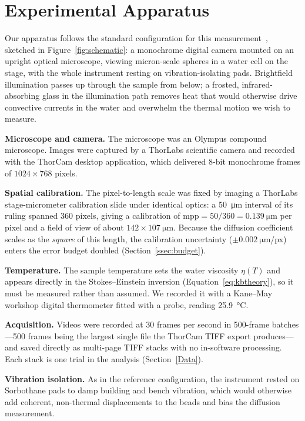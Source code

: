 \documentclass[11pt]{article}
\begin{document}
\section{Experimental Apparatus}
\label{Experimental Apparatus}
Our apparatus follows the standard configuration for this measurement~\cite{nakroshis},
sketched in Figure~\ref{fig:schematic}: a monochrome digital camera mounted on an
upright optical microscope, viewing micron-scale spheres in a water cell on the
stage, with the whole instrument resting on vibration-isolating pads. Brightfield
illumination passes up through the sample from below; a frosted, infrared-absorbing
glass in the illumination path removes heat that would otherwise drive convective
currents in the water and overwhelm the thermal motion we wish to measure.

\textbf{Microscope and camera.} The microscope was an Olympus compound microscope.
Images were captured by a ThorLabs scientific camera and recorded with the ThorCam
desktop application, which delivered 8-bit monochrome frames of $1024\times768$
pixels.

\textbf{Spatial calibration.} The pixel-to-length scale was fixed by imaging a
ThorLabs stage-micrometer calibration slide under identical optics: a
\SI{50}{\micro\meter} interval of its ruling spanned $360$ pixels, giving a
calibration of $\text{mpp} = 50/360 = \SI{0.139}{\micro\meter}$ per pixel and a field
of view of about $142\times107~\si{\micro\meter}$. Because the diffusion coefficient
scales as the \emph{square} of this length, the calibration uncertainty
($\pm\SI{0.002}{\micro\meter}$/px) enters the error budget doubled
(Section~\ref{ssec:budget}).

\textbf{Temperature.} The sample temperature sets the water viscosity $\eta(T)$ and
appears directly in the Stokes--Einstein inversion
(Equation~\eqref{eq:kbtheory}), so it must be measured rather than assumed. We
recorded it with a Kane--May workshop digital thermometer fitted with a probe,
reading \SI{25.9}{\celsius}.

\textbf{Acquisition.} Videos were recorded at 30 frames per second in
500-frame batches---500 frames being the largest single file the ThorCam TIFF export
produces---and saved directly as multi-page TIFF stacks with no in-software
processing. Each stack is one trial in the analysis (Section~\ref{Data}).

\textbf{Vibration isolation.} As in the reference configuration, the instrument
rested on Sorbothane pads to damp building and bench vibration, which would otherwise
add coherent, non-thermal displacements to the beads and bias the diffusion
measurement.
\end{document}
